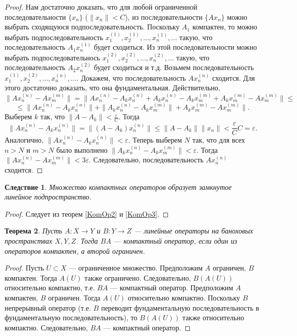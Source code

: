 \documentclass[12pt, titlepage, oneside]{amsbook}
\newtheorem{theorem}{Теорема}[chapter]
\newtheorem{corollary}[theorem]{Следствие}
\theoremstyle{definition}
\theoremstyle{remark}
\begin{document}
\begin{proof}
	Нам достаточно доказать, что для любой ограниченной последовательности $\{x_n\}$ ($\|x_n\|<C$), из последовательности $\{Ax_n\}$ можно выбрать сходящуюся подпоследовательность. Поскольку $A_1$ компактен, то можно выбрать подпоследовательность $x_1^{(1)},x_2^{(1)},\ldots,x_n^{(1)},\ldots$ такую, что последовательность $A_1x_n^{(1)}$ будет сходиться. Из этой последовательности можно выбрать подпоследовательнось $x_1^{(2)},x_2^{(2)},\ldots,x_n^{(2)},\ldots$ такую, что последовательность $A_2x_n^{(2)}$ будет сходиться и т.д. Возьмем последовательность $x_1^{(1)},x_2^{(2)},\ldots,x_n^{(n)},\ldots$. Докажем, что последовательность $Ax_n^{(n)}$ сходится. Для этого достаточно доказать, что она фундаментальная. Действительно, $$\|Ax_n^{(n)}-Ax_m^{(m)}\|=\|Ax_n^{(n)}-A_kx_n^{(n)}+A_kx_n^{(n)}-A_kx_m^{(m)}+A_kx_m^{(m)}-Ax_m^{(m)}\|\leq$$ $$\leq\|Ax_n^{(n)}-A_kx_n^{(n)}\|+\|A_kx_n^{(n)}-A_kx_m^{(m)}\|+A_kx_m^{(m)}-Ax_m^{(m)}\|.$$ Выберем $k$ так, что $\|A-A_k\|<\frac{\varepsilon}{C}$. Тогда $$\|Ax_n^{(n)}-A_kx_n^{(n)}\|=\|(A-A_k)x_n^{(n)}\|\leq\|A-A_k\|\|x_n\|<\frac{\varepsilon}{C}C=\varepsilon.$$ Аналогично, $\|Ax_n^{(n)}-A_kx_n^{(n)}\|<\varepsilon$. Теперь выберем $N$ так, что для всех $n>N$ и $m>N$ было выполнено $\|A_kx_n^{(n)}-A_kx_m^{(m)}\|<\varepsilon$. Тогда $\|Ax_n^{(n)}-Ax_m^{(m)}\|<3\varepsilon$. Следовательно, последовательность $Ax_n^{(n)}$ сходится.
\end{proof}

\begin{corollary}
	\label{KomOp4}
	Множество компактных операторов образует замкнутое линейное подпространство.
\end{corollary}

\begin{proof}
	Следует из теорем \ref{KomOp2} и \ref{KomOp3}.
\end{proof}

\begin{theorem}
	\label{KomOp5}
	Пусть $A\colon X\rightarrow Y$ и $B\colon Y\rightarrow Z$ --- линейные операторы на баноховых пространствах $X,Y,Z$. Тогда $BA$ --- компактный оператор, если один из операторов компактен, а второй ограничен.
\end{theorem}

\begin{proof}
	Пусть $U\subset X$ --- ограниченное множество. Предположим $A$ ограничен, $B$ компактен. Тогда $A(U)$ также ограничено. Следовательно, $B(A(U))$ относительно компактно, т.е. $BA$ --- компактный оператор. Предположим $A$ компактен, $B$ ограничен. Тогда $A(U)$ относительно компактно. Поскольку $B$ непрерывный оператор (т.е. $B$ переводит фундаментальную последовательность в фундаментальную последовательность), то $B(A(U))$ также относительно компактно. Следовательно, $BA$ --- компактный оператор.
\end{proof}
\end{document}
